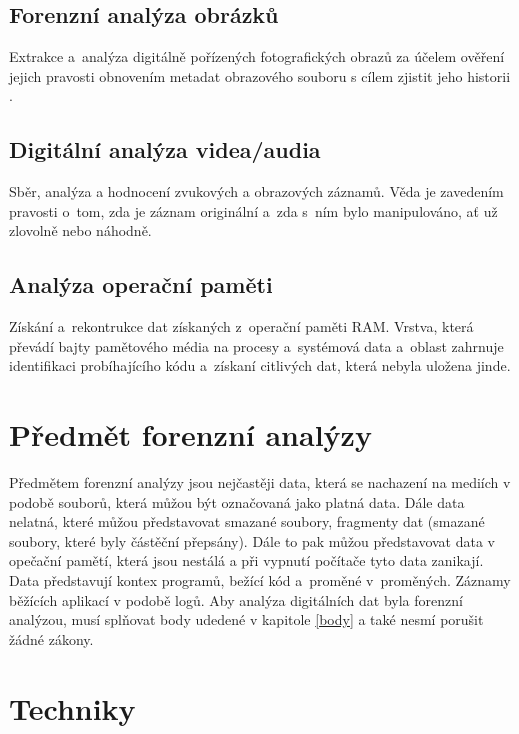 \documentclass[thesis=B,czech]{FITthesis}[2012/06/26]
\begin{document}
\subsection{Forenzní analýza obrázků}
Extrakce a~analýza digitálně pořízených fotografických obrazů za účelem ověření jejich pravosti obnovením metadat obrazového souboru s cílem zjistit jeho historii \cite{for_types}.

\subsection{Digitální analýza videa/audia}
Sběr, analýza a hodnocení zvukových a obrazových záznamů. Věda je zavedením pravosti o~tom, zda je záznam originální a~zda s~ním bylo manipulováno, ať už zlovolně nebo náhodně.

\subsection{Analýza operační paměti}
Získání a~rekontrukce dat získaných z~operační paměti RAM. Vrstva, která převádí bajty pamětového média na procesy a~systémová data a~oblast zahrnuje identifikaci probíhajícího kódu a~získaní citlivých dat, která nebyla uložena jinde\cite{carrier2003defining}. 




\section{Předmět forenzní analýzy}

Předmětem forenzní analýzy jsou nejčastěji data, která se nachazení na mediích v podobě souborů, která můžou být označovaná jako platná data. Dále data nelatná, které můžou představovat smazané soubory, fragmenty dat (smazané soubory, které byly částěční přepsány). Dále to pak můžou představovat data v opečační pamětí, která jsou nestálá a při vypnutí počítače tyto data zanikají. Data představují kontex programů, bežící kód a~proměné v~proměných. Záznamy běžících aplikací v podobě logů. 
Aby analýza digitálních dat byla forenzní analýzou, musí splňovat body udedené v kapitole \ref{body} a také nesmí porušit  žádné zákony.



\section{Techniky}
\end{document}
